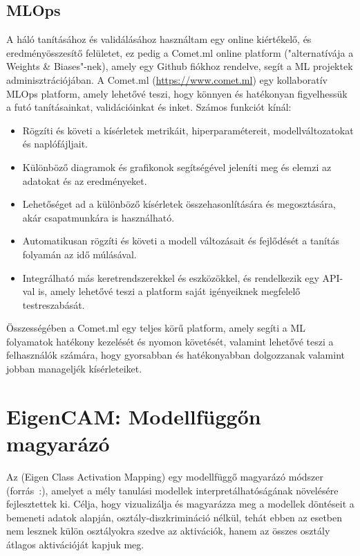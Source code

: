\documentclass[12pt,oneside,a4paper]{article}
\newcommand{\newsection}[1]{\clearpage\section{#1}}\label{makro}
\theoremstyle{remark}
\begin{document}
\subsection{MLOps}\label{subsec:mlops}
A háló tanításához és validálásához használtam egy online kiértékelő, és eredményösszesítő felületet, ez pedig a Comet.ml online platform ("alternatívája a Weights \& Biases"-nek), amely egy Github fiókhoz rendelve, segít a \ac{ML} projektek adminisztrációjában.
A Comet.ml (\url{https://www.comet.ml}) egy kollaboratív \ac{MLOps} platform, amely lehetővé teszi, hogy könnyen és
    hatékonyan figyelhessük a futó tanításainkat, validációinkat és inket.
    Számos funkciót kínál:
    \begin{itemize}
        \item Rögzíti és követi a kísérletek metrikáit, hiperparamétereit, modellváltozatokat és naplófájljait.
        \item Különböző diagramok és grafikonok segítségével jeleníti meg és elemzi az adatokat és az eredményeket.
        \item Lehetőséget ad a különböző kísérletek összehasonlítására és megosztására, akár csapatmunkára is használható.
        \item Automatikusan rögzíti és követi a modell változásait és fejlődését a tanítás folyamán az idő múlásával.
        \item Integrálható más keretrendszerekkel és eszközökkel, és rendelkezik egy API-val is, amely lehetővé teszi a platform
            saját igényeiknek megfelelő testreszabását.
    \end{itemize}
        Összességében a Comet.ml egy teljes körű platform, amely segíti a \ac{ML} folyamatok hatékony kezelését
        és nyomon követését, valamint lehetővé teszi a felhasználók számára, hogy gyorsabban és hatékonyabban dolgozzanak
        valamint jobban manageljék kísérleteiket.

\newsection{EigenCAM: Modellfüggőn magyarázó}\label{sec:eigencam:-modellfuggo-magyarazo}
     Az  (Eigen Class Activation Mapping) egy modellfüggő magyarázó módszer (forrás~\cite{pytorch-grad-cam}:), amelyet a mély tanulási
     modellek interpretálhatóságának növelésére fejlesztettek ki.
     Célja, hogy vizualizálja és magyarázza meg a modellek döntéseit a bemeneti adatok alapján,
     osztály-diszkrimináció nélkül, tehát ebben az esetben nem lesznek külön osztályokra szedve az aktivációk, hanem az
     összes osztály átlagos aktivációját kapjuk meg.
\end{document}

